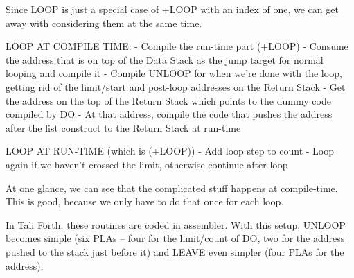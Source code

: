 Since LOOP is just a special case of +LOOP with an index of one, we can get
away with considering them at the same time. 


LOOP AT COMPILE TIME: 
- Compile the run-time part (+LOOP)
- Consume the address that is on top of the Data Stack as the jump target for 
  normal looping and compile it
- Compile UNLOOP for when we're done with the loop, getting rid of the 
  limit/start and post-loop addresses on the Return Stack 
- Get the address on the top of the Return Stack which points to the dummy
  code compiled by DO
- At that address, compile the code that pushes the address after the list
  construct to the Return Stack at run-time

LOOP AT RUN-TIME (which is (+LOOP)) 
- Add loop step to count
- Loop again if we haven't crossed the limit, otherwise continue after loop

At one glance, we can see that the complicated stuff happens at compile-time.
This is good, because we only have to do that once for each loop. 

In Tali Forth, these routines are coded in assembler. With this setup, UNLOOP
becomes simple (six PLAs -- four for the limit/count of DO, two for the address
pushed to the stack just before it) and LEAVE even simpler (four PLAs for the
address). 


